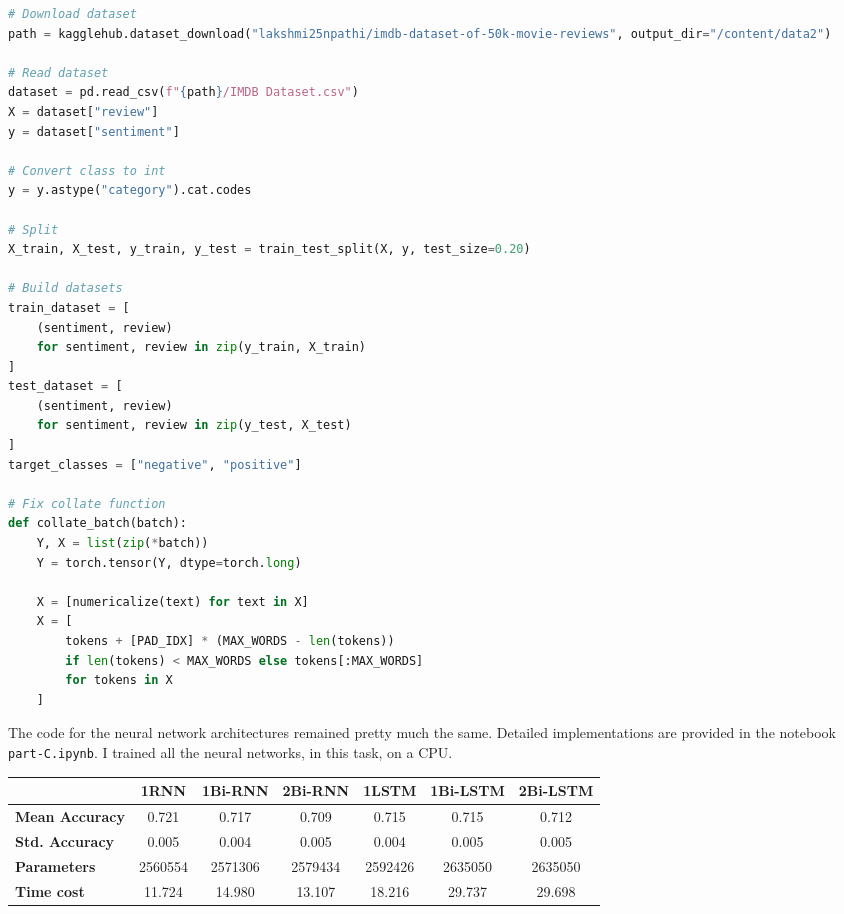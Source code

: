 \documentclass[8pt,a4paper]{report}%
\begin{document}
\begin{lstlisting}[language=Python]
# Download dataset
path = kagglehub.dataset_download("lakshmi25npathi/imdb-dataset-of-50k-movie-reviews", output_dir="/content/data2")

# Read dataset
dataset = pd.read_csv(f"{path}/IMDB Dataset.csv")
X = dataset["review"]
y = dataset["sentiment"]

# Convert class to int
y = y.astype("category").cat.codes

# Split
X_train, X_test, y_train, y_test = train_test_split(X, y, test_size=0.20)

# Build datasets
train_dataset = [
    (sentiment, review)
    for sentiment, review in zip(y_train, X_train)
]
test_dataset = [
    (sentiment, review)
    for sentiment, review in zip(y_test, X_test)
]
target_classes = ["negative", "positive"]

# Fix collate function
def collate_batch(batch):
    Y, X = list(zip(*batch))
    Y = torch.tensor(Y, dtype=torch.long)

    X = [numericalize(text) for text in X]
    X = [
        tokens + [PAD_IDX] * (MAX_WORDS - len(tokens))
        if len(tokens) < MAX_WORDS else tokens[:MAX_WORDS]
        for tokens in X
    ]
\end{lstlisting}

The code for the neural network architectures remained pretty much the same. Detailed implementations are provided in the notebook \lstinline{part-C.ipynb}. I trained all the neural networks, in this task, on a CPU.

\begin{table}[H]
\begin{tabular}{|l|c|c|c|c|c|c|}
\hline
\multicolumn{1}{|c|}{\textbf{}} & \textbf{1RNN} & \textbf{1Bi-RNN} & \textbf{2Bi-RNN} & \textbf{1LSTM} & \textbf{1Bi-LSTM} & \textbf{2Bi-LSTM} \\ \hline
\textbf{Mean Accuracy}          & 0.721         & 0.717            & 0.709            & 0.715          & 0.715             & 0.712             \\ \hline
\textbf{Std. Accuracy}          & 0.005         & 0.004            & 0.005            & 0.004          & 0.005             & 0.005             \\ \hline
\textbf{Parameters}             & 2560554       & 2571306          & 2579434          & 2592426        & 2635050           & 2635050           \\ \hline
\textbf{Time cost}              & 11.724        & 14.980           & 13.107           & 18.216         & 29.737            & 29.698            \\ \hline
\end{tabular}
\end{table}
\end{document}
